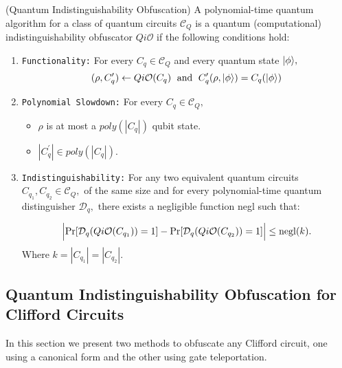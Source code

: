 \begin{definition}\label{def:QiO} {\rm (Quantum Indistinguishability Obfuscation)}
A  polynomial-time quantum algorithm for a class of quantum circuits $\mathcal{C}_Q$ is a quantum {\rm(}computational{\rm)} indistinguishability obfuscator $Qi\mathcal{O}$  if the following conditions hold:

\begin{enumerate}
\item {\tt Functionality:}  For every $C_q\in \mathcal{C}_Q$ and every quantum state ${\lvert}\phi\rangle,$
$$(\rho, C_q^\prime)\leftarrow Qi\mathcal{O}(C_q) \;  \mbox{ and }\; C_q^\prime(\rho,{\lvert}\phi\rangle)=C_{q}({\lvert}\phi\rangle)$$
											

\item  {\tt Polynomial Slowdown:}  For every $C_{q}\in \mathcal{C}_Q,$
\begin{itemize}
\item  $\rho$ is at most a $poly(|C_{q}|)$ qubit state. 
\item $|C_{q}^\prime| \in poly(|C_{q}|).$
\end{itemize}

\item {\tt Indistinguishability:} For any two equivalent quantum circuits $C_{q_1},C_{q_2}\in \mathcal{C}_Q,$ of the same size
 and for every polynomial-time quantum distinguisher $\mathcal{D}_q,$ there exists a negligible function {\rm negl} such that:

	
					$$\Big |{\rm Pr}[\mathcal{D}_q(Qi\mathcal{O}(C_{q_1}))=1]-{\rm Pr}[\mathcal{D}_q(Qi\mathcal{O}(C_{q_2}))=1] \Big |\leq  {\rm negl}(k).$$		
Where $k=|C_{q_1}|=|C_{q_2}|.$						
\end{enumerate}

\end{definition}


\subsection{Quantum Indistinguishability Obfuscation for Clifford Circuits}
 In this section we present two methods to obfuscate any Clifford circuit,  one using a canonical form and the other using gate teleportation.

